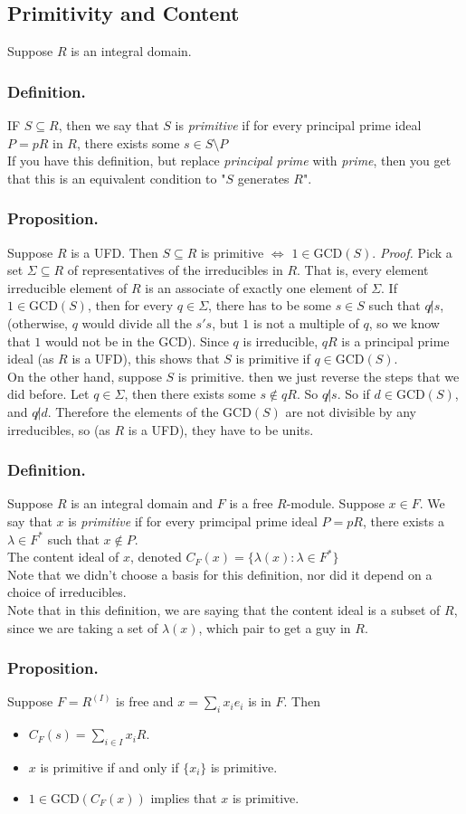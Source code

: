 \documentclass{article}
\newcommand{\vs}{\bigskip\\\text{}}
\newcommand{\beginproof}{\vspace{10pt}\newline\textit{Proof.}\hspace{1em}}
\begin{document}
\subsection{Primitivity and Content}
Suppose $R$ is an integral domain.
\subsubsection{Definition.}  IF $S \subseteq R$, then we say that $S$ is
\textit{primitive} if for every principal prime ideal $P = pR$ in $R$, there
exists some $s \in S\setminus P$\vs
If you have this definition, but replace \textit{principal prime} with
\textit{prime}, then you get that this is an equivalent condition to "$S$
generates $R$". 
\subsubsection{Proposition.} Suppose $R$ is a UFD. Then $S\subseteq R$ is primitive
$\iff$ $1 \in \text{GCD}(S)$. \beginproof
Pick a set $\Sigma \subseteq R$ of representatives of the irreducibles in $R$.
That is, every element irreducible element of $R$ is an associate of exactly one element of
$\Sigma$.
If $1 \in \text{GCD}(S)$, then for every $q \in \Sigma$, there has to be some $s\in S$
such that $q \not | s$, (otherwise, $q$ would divide all the $s's$, but $1$ is
not a multiple of $q$, so we know that $1$ would not be in the $\text{GCD}$). Since $q$
is irreducible, $qR$ is a principal prime ideal (as $R$ is a UFD), this shows
that $S$ is primitive if $q \in \text{GCD}(S)$.\vs
On the other hand, suppose $S$ is primitive. then we just reverse the steps that
we did before. Let $q \in \Sigma$, then there exists some $s\not\in qR$. So
$q\not | s$. So if $d \in \text{GCD}(S)$, and $q \not| d$. Therefore the elements of
the $\text{GCD}(S)$ are not divisible by any irreducibles, so (as $R$ is a UFD), they
have to be units.
\subsubsection{Definition.} Suppose $R$ is an integral domain and $F$ is a free
$R$-module. Suppose $x \in F$. We say that $x$ is \textit{primitive} if
for every primcipal prime ideal $P = pR$, there exists a $\lambda \in F^*$
such that $x\not \in P$. \vs
The content ideal of $x$, denoted $C_F(x) =\{\lambda(x): \lambda \in F^*\}$\vs
Note that we didn't choose a basis for this definition, nor did it depend on a
choice of irreducibles.\vs
Note that in this definition, we are saying that the content ideal is a subset
of $R$, since we are taking a set of $\lambda(x)$, which pair to get a guy in
$R$.
\subsubsection{Proposition.} Suppose $F = R^{(I)}$ is free and $x =
\sum_ix_ie_i$ is in $F$. Then 
\begin{itemize}
\item $C_F(s) = \sum_{i\in I}x_iR$.
\item $x$ is primitive if and only if $\{x_i\}$ is primitive.
\item $1 \in \text{GCD}(C_F(x))$ implies that $x$ is primitive.
\end{itemize}  
\end{document}
